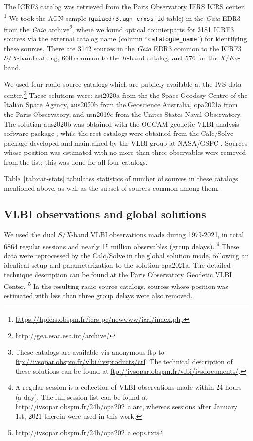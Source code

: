 \documentclass{aa}
\begin{document}
    The ICRF3 catalog \citep{2020A&A...644A.159C} was retrieved from the Paris Observatory IERS ICRS center. \footnote{\url{https://hpiers.obspm.fr/icrs-pc/newwww/icrf/index.php}}
    We took the AGN sample (\texttt{gaiaedr3.agn\_cross\_id} table) in the \textit{Gaia} EDR3 from the \textit{Gaia} archive\footnote{\url{http://gea.esac.esa.int/archive/}}, where we found optical counterparts for 3181 ICRF3 sources via the external catalog name (column ``\texttt{catalogue\_name}'') for identifying these sources.
    There are 3142 sources in the \textit{Gaia} EDR3 common to the ICRF3 $S/X$-band catalog, 660 common to the $K$-band catalog, and 576 for the $X/Ka$-band.
    
    We used four radio source catalogs which are publicly available at the IVS data center.\footnote{These catalogs are available via anonymous ftp to \url{ftp://ivsopar.obspm.fr/vlbi/ivsproducts/crf}. The technical description of these solutions can be found at \url{ftp://ivsopar.obspm.fr/vlbi/ivsdocuments/}.}
    These solutions were: asi2020a from the the Space Geodesy Centre of the Italian Space Agency, aus2020b from the Geoscience Australia, opa2021a from the Paris Observatory, and usn2019c from the Unites States Naval Observatory.
    The solution aus2020b was obtained with the OCCAM geodetic VLBI analysis software package \citep{2004ivsg.conf..267T}, while the rest catalogs were obtained from the Calc/Solve package developed and maintained by the VLBI group at NASA/GSFC \citep{1986AJ.....92.1020M}.
    Sources whose position was estimated with no more than three observables were removed from the list; this was done for all four catalogs.
    
    Table~\ref{tab:cat-stats} tabulates statistics of number of sources in these catalogs mentioned above, as well as the subset of sources common among them.


\subsection{VLBI observations and global solutions}  \label{subsec:vlbi-data}

    We used the dual $S/X$-band VLBI observations made during 1979-2021, in total 6864 regular sessions and nearly 15 million observables (group delays). \footnote{A regular session is a collection of VLBI observations made within 24 hours (a day). The full session list can be found at \url{http://ivsopar.obspm.fr/24h/opa2021a.arc}, whereas sessions after January 1st, 2021 therein were used in this work.}
    These data were reprocessed by the Calc/Solve in the global solution mode, following an identical setup and parameterization to the solution opa2021a.
    The detailed technique description can be found at the Paris Observatory Geodetic VLBI Center. \footnote{\url{http://ivsopar.obspm.fr/24h/opa2021a.eops.txt}}
    In the resulting radio source catalogs, sources whose position was estimated with less than three group delays were also removed.
\end{document}
